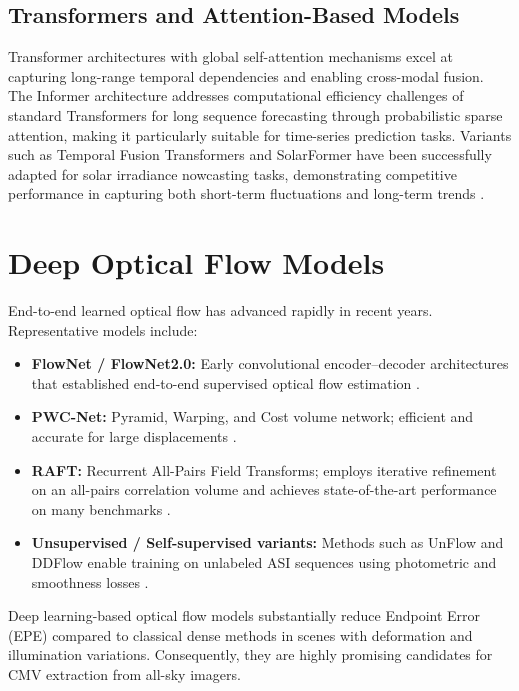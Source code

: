 \subsection{Transformers and Attention-Based Models}
Transformer architectures \cite{vaswani2017} with global self-attention 
mechanisms excel at capturing long-range temporal dependencies and enabling 
cross-modal fusion. The Informer architecture \cite{zhou2021informer} 
addresses computational efficiency challenges of standard Transformers for 
long sequence forecasting through probabilistic sparse attention, making it 
particularly suitable for time-series prediction tasks. Variants such as 
Temporal Fusion Transformers and SolarFormer have been successfully adapted 
for solar irradiance nowcasting tasks, demonstrating competitive performance 
in capturing both short-term fluctuations and long-term trends 
\cite{alorf2025temporal,li2024solarformer}.

\section{Deep Optical Flow Models}
End-to-end learned optical flow has advanced rapidly in recent years. Representative models include:

\begin{itemize}
  \item \textbf{FlowNet / FlowNet2.0:} Early convolutional encoder--decoder architectures that established end-to-end supervised optical flow estimation \cite{dosovitskiy2015flownet,ilg2017flownet2}.
  \item \textbf{PWC-Net:} Pyramid, Warping, and Cost volume network; efficient and accurate for large displacements \cite{sun2018pwc}.
  \item \textbf{RAFT:} Recurrent All-Pairs Field Transforms; employs iterative refinement on an all-pairs correlation volume and achieves state-of-the-art performance on many benchmarks \cite{teed2020raft}.
  \item \textbf{Unsupervised / Self-supervised variants:} Methods such as UnFlow and DDFlow enable training on unlabeled ASI sequences using photometric and smoothness losses \cite{meister2018unflow,liu2019ddflow}.
\end{itemize}

Deep learning-based optical flow models substantially reduce Endpoint Error (EPE) compared to classical dense methods in scenes with deformation and illumination variations. Consequently, they are highly promising candidates for CMV extraction from all-sky imagers.

